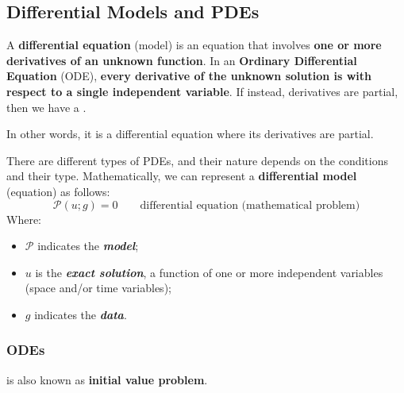 \subsection{Differential Models and PDEs}

\begin{definitionbox}
    A \textbf{differential equation} (model) is an equation that involves \textbf{one or more derivatives of an unknown function}. In an \textbf{Ordinary Differential Equation} (ODE), \textbf{every derivative of the unknown solution is with respect to a single independent variable}. If instead, derivatives are partial, then we have a .
\end{definitionbox}

\noindent
In other words, it is a differential equation where its derivatives are partial.

\highspace
There are different types of PDEs, and their nature depends on the conditions and their type. Mathematically, we can represent a \textbf{differential model} (equation) as follows:
\begin{equation}
    \mathcal{P}\left(u; g\right) = 0 \hspace{2em} \text{differential equation (mathematical problem)}
\end{equation}
Where:
\begin{itemize}
    \item $\mathcal{P}$ indicates the \emph{\textbf{model}};
    \item $u$ is the \emph{\textbf{exact solution}}, a function of one or more independent variables (space and/or time variables);
    \item $g$ indicates the \emph{\textbf{data}}.
\end{itemize}

\newpage

\subsubsection{ODEs}

 is also known as \textbf{initial value problem}.

